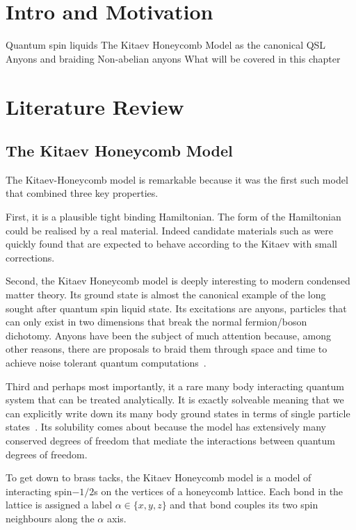 \section{Intro and Motivation}
		Quantum spin liquids
		The Kitaev Honeycomb Model as the canonical QSL
		Anyons and braiding
		Non-abelian anyons
        What will be covered in this chapter
	
\section{Literature Review} 
\subsection{The Kitaev Honeycomb Model}

The Kitaev-Honeycomb model is remarkable because it was the first such model that combined three key properties.

First, it is a plausible tight binding Hamiltonian. The form of the Hamiltonian could be realised by a real material. Indeed candidate materials such as  were quickly found \cite{banerjeeProximateKitaevQuantum2016, trebstKitaevMaterials2022} that are expected to behave according to the Kitaev with small corrections. 

Second, the Kitaev Honeycomb model is deeply interesting to modern condensed matter theory. Its ground state is almost the canonical example of the long sought after quantum spin liquid state. Its excitations are anyons, particles that can only exist in two dimensions that break the normal fermion/boson dichotomy. Anyons have been the subject of much attention because, among other reasons, there are proposals to braid them through space and time to achieve noise tolerant quantum computations~\cite{freedmanTopologicalQuantumComputation2003}. 

Third and perhaps most importantly, it a rare many body interacting quantum system that can be treated analytically. It is exactly solveable meaning that we can explicitly write down its many body ground states in terms of single particle states~\cite{kitaevAnyonsExactlySolved2006}. Its solubility comes about because the model has extensively many conserved degrees of freedom that mediate the interactions between quantum degrees of freedom.

To get down to brass tacks, the Kitaev Honeycomb model is a model of interacting spin$-1/2$s on the vertices of a honeycomb lattice. Each bond in the lattice is assigned a label $\alpha \in \{ x, y, z\}$ and that bond couples its two spin neighbours along the $\alpha$ axis. 

